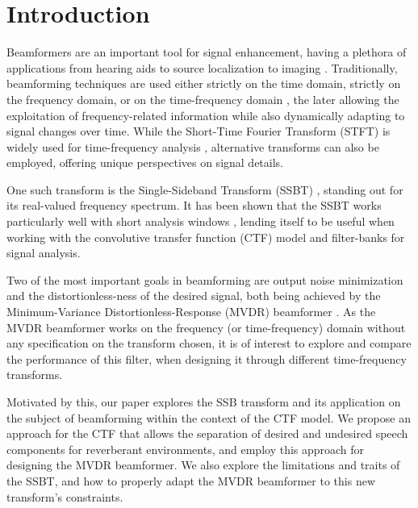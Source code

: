 \section{Introduction}
\label{sec:introduction}

Beamformers are an important tool for signal enhancement, having a plethora of applications from hearing aids \cite{lobato_worst-case-optimization_2020} to source localization \cite{chen_source_2002} to imaging \cite{lu_biomedical_1994,nguyen_minimum_2017}. Traditionally, beamforming techniques are used either strictly on the time domain, strictly on the frequency domain, or on the time-frequency domain \cite{benesty_fundamentals_2018}, the later allowing the exploitation of frequency-related information while also dynamically adapting to signal changes over time. While the Short-Time Fourier Transform (STFT) is widely used for time-frequency analysis \cite{kiymik_comparison_2005,pan_microphone_2021}, alternative transforms \cite{chen_wavelet-based_2018,yang_general_2014,almeida_fractional_1994} can also be employed, offering unique perspectives on signal details.

One such transform is the Single-Sideband Transform (SSBT) \cite{crochiere_multirate_1983,oyzerman_speech_2012}, standing out for its real-valued frequency spectrum. It has been shown that the SSBT works particularly well with short analysis windows \cite{crochiere_multirate_1983}, lending itself to be useful when working with the convolutive transfer function (CTF) model \cite{talmon_relative_2009} and filter-banks \cite{?} for signal analysis.

Two of the most important goals in beamforming are output noise minimization and the distortionless-ness of the desired signal, both being achieved by the Minimum-Variance Distortionless-Response (MVDR) beamformer \cite{capon_high-resolution_1969,erdogan_improved_2016}. As the MVDR beamformer works on the frequency (or time-frequency) domain without any specification on the transform chosen, it is of interest to explore and compare the performance of this filter, when designing it through different time-frequency transforms.

Motivated by this, our paper explores the SSB transform and its application on the subject of beamforming within the context of the CTF model. We propose an approach for the CTF that allows the separation of desired and undesired speech components for reverberant environments, and employ this approach for designing the MVDR beamformer. We also explore the limitations and traits of the SSBT, and how to properly adapt the MVDR beamformer to this new transform's constraints.

